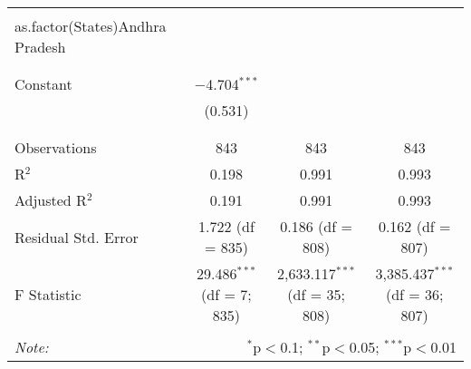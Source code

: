 \begin{table}[!htbp]
\begin{tabular}{@{\extracolsep{5pt}}lccc}
  & & & \\ 
 as.factor(States)Andhra Pradesh &  &  &  \\ 
  &  &  &  \\ 
  & & & \\ 
 Constant & $-$4.704$^{***}$ &  &  \\ 
  & (0.531) &  &  \\ 
  & & & \\ 
\hline \\[-1.8ex] 
Observations & 843 & 843 & 843 \\ 
R$^{2}$ & 0.198 & 0.991 & 0.993 \\ 
Adjusted R$^{2}$ & 0.191 & 0.991 & 0.993 \\ 
Residual Std. Error & 1.722 (df = 835) & 0.186 (df = 808) & 0.162 (df = 807) \\ 
F Statistic & 29.486$^{***}$ (df = 7; 835) & 2,633.117$^{***}$ (df = 35; 808) & 3,385.437$^{***}$ (df = 36; 807) \\ 
\hline 
\hline \\[-1.8ex] 
\textit{Note:}  & \multicolumn{3}{r}{$^{*}$p$<$0.1; $^{**}$p$<$0.05; $^{***}$p$<$0.01} \\ 
\end{tabular} 
\end{table} 
